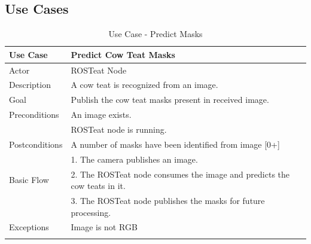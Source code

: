 \subsection{Use Cases}
\lipsum[2]
\begin{longtable}{@{} p{3.5cm} p{10.5cm} @{}} \toprule
\textbf{Use Case}       & \textbf{Predict Cow Teat Masks} \\ \midrule
Actor                   & ROSTeat Node \\ \cmidrule{1-2}
Description             & A cow teat is recognized from an image. \\ \cmidrule{1-2}
Goal                    & Publish the cow teat masks present in received image. \\ \cmidrule{1-2}
Preconditions           & An image exists. \\ 
                        & ROSTeat node is running. \\ \cmidrule{1-2} 
Postconditions          & A number of masks have been identified from image [0+]\\ \cmidrule{1-2} 
                        & 1. The camera publishes an image. \\ 
Basic Flow              & 2. The ROSTeat node consumes the image and predicts the cow teats in it. \\
                        & 3. The ROSTeat node publishes the masks for future processing. \\ \cmidrule{1-2}
Exceptions             & Image is not RGB \\ \bottomrule
\caption{Use Case - Predict Masks} \label{tab:tabcu-prop} \\
\end{longtable}

